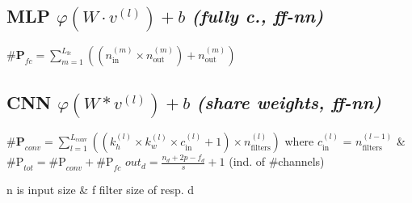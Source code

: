 \subsection*{MLP \quad \color{Black}$\varphi(W \cdot v^{(l)}) + b$ \normalfont \textit{(fully c., ff-nn)} }
$\textbf{\#P}_{fc} = \sum_{m=1}^{L_{\text{fc}}} \left( (n_{\text{in}}^{(m)} \times n_{\text{out}}^{(m)}) + n_{\text{out}}^{(m)} \right)$


\subsection*{CNN \quad \color{Black}$\varphi(W * v^{(l)}) + b$ \normalfont \textit{(share weights, ff-nn)} }
$\textbf{\#P}_{conv} = \sum_{l=1}^{L_{\text{conv}}} \left( (k_h^{(l)} \times k_w^{(l)} \times c_{\text{in}}^{(l)} + 1) \times n_{\text{filters}}^{(l)} \right)
$
where $c_{\text{in}}^{(l)}$ =  $n_{\text{filters}}^{(l-1)}$ \& $\text{\#P}_{tot} = \text{\#P}_{conv} + \text{\#P}_{fc}$
$out_d = \frac{n_d + 2p - f_d}{s} + 1$  (ind. of \#channels)

n is input size \& f filter size of resp. d
